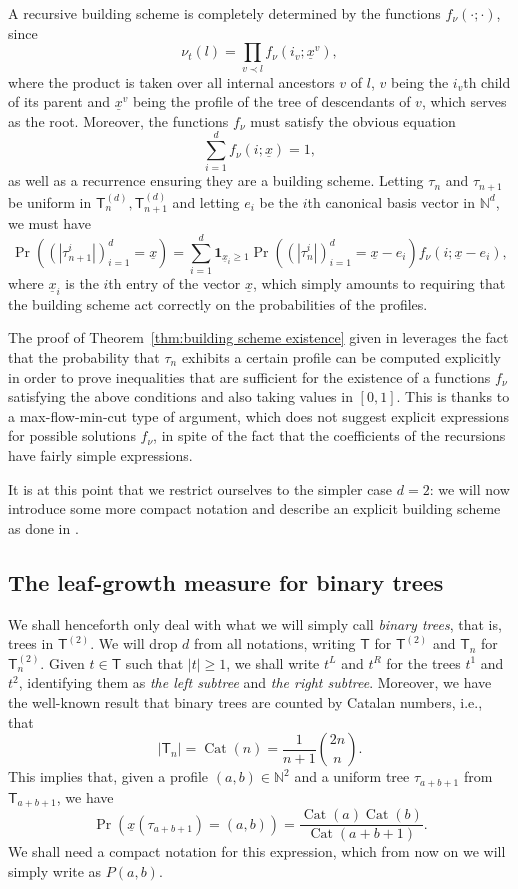 \documentclass[11pt]{article}
\renewcommand{\geq}{\geqslant}
\newcommand{\sT}{\mathsf{T}} %
\newcommand{\Cat}{\operatorname{Cat}}
\begin{document}
A recursive building scheme is completely determined by the functions $f_\nu(\cdot ; \cdot)$, since
$$\nu_t(l)=\prod_{v\prec l}f_\nu(i_v;\underline{x}^v),$$
where the product is taken over all internal ancestors $v$ of $l$, $v$ being the $i_v$th child of its parent and $\underline{x}^v$ being the profile of the tree of descendants of $v$, which serves as the root. Moreover, the functions $f_\nu$ must satisfy the obvious equation
$$\sum_{i=1}^df_\nu(i;\underline{x})=1,$$
as well as a recurrence ensuring they are a building scheme. Letting $\tau_n$ and $\tau_{n+1}$ be uniform in $\sT_n^{(d)}, \sT_{n+1}^{(d)}$ and letting $e_i$ be the $i$th canonical basis vector in $\mathbb{N}^d$, we must have
\begin{equation}\label{eq:d-ary recursion}\Pr((|\tau_{n+1}^i|)_{i=1}^d=\underline{x})=\sum_{i=1}^d\mathbf{1}_{\underline{x}_i\geq 1}\Pr((|\tau_{n}^i|)_{i=1}^d=\underline{x}-e_i)f_\nu(i;\underline{x}-e_i),\end{equation}
where $\underline{x}_i$ is the $i$th entry of the vector $\underline{x}$, which simply amounts to requiring that the building scheme act correctly on the probabilities of the profiles.

The proof of Theorem~\ref{thm:building scheme existence} given in \cite{LW04} leverages the fact that the probability that $\tau_n$ exhibits a certain profile can be computed explicitly in order to prove inequalities that are sufficient for the existence of a functions $f_\nu$ satisfying the above conditions and also taking values in $[0,1]$. This is thanks to a max-flow-min-cut type of argument, which does not suggest explicit expressions for possible solutions $f_\nu$, in spite of the fact that the coefficients of the recursions have fairly simple expressions.

It is at this point that we restrict ourselves to the simpler case $d=2$: we will now introduce some more compact notation and describe an explicit building scheme as done in \cite{CS20}.

\subsection{The leaf-growth measure for binary trees}

We shall henceforth only deal with what we will simply call \emph{binary trees}, that is, trees in $\sT^{(2)}$. We will drop $d$ from all notations, writing $\sT$ for $\sT^{(2)}$ and $\sT_n$ for $\sT_n^{(2)}$. Given $t\in \sT$ such that $|t|\geq 1$, we shall write $t^L$ and $t^R$ for the trees $t^1$ and $t^2$, identifying them as \emph{the left subtree} and \emph{the right subtree}. Moreover, we have the well-known result that binary trees are counted by Catalan numbers, i.e., that
\[|\sT_n|=\Cat(n)=\frac{1}{n+1}\binom{2n}{n}.\]
This implies that, given a profile $(a,b)\in\mathbb{N}^2$ and a uniform tree $\tau_{a+b+1}$ from $\sT_{a+b+1}$, we have
\[\Pr(\underline{x}(\tau_{a+b+1})=(a,b))=\frac{\Cat(a)\Cat(b)}{\Cat(a+b+1)}.\]
We shall need a compact notation for this expression, which from now on we will simply write as $P(a,b)$.
\end{document}
